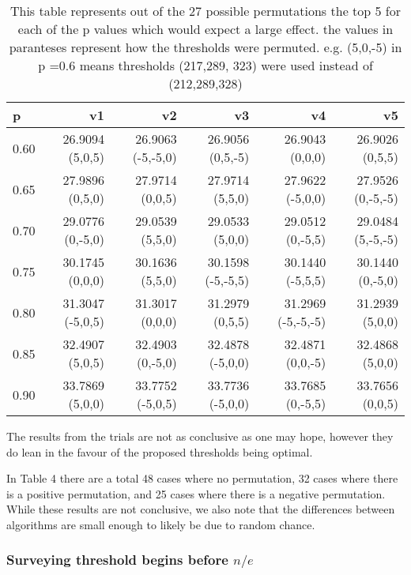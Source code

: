 \documentclass[a4paper,11pt]{article}
\begin{document}
\begin{table}[ht]
\centering
\begin{tabular}{lrrrrr}
\hline
p & v1 & v2 & v3 & v4 & v5 \\
\hline
0.60 & 26.9094 (5,0,5) & 26.9063 (-5,-5,0) & 26.9056 (0,5,-5) & 26.9043 (0,0,0) & 26.9026 (0,5,5) \\
0.65 & 27.9896 (0,5,0) & 27.9714 (0,0,5) & 27.9714 (5,5,0) & 27.9622 (-5,0,0) & 27.9526 (0,-5,-5) \\
0.70 & 29.0776 (0,-5,0) & 29.0539 (5,5,0) & 29.0533 (5,0,0) & 29.0512 (0,-5,5) & 29.0484 (5,-5,-5) \\
0.75 & 30.1745 (0,0,0) & 30.1636 (5,5,0) & 30.1598 (-5,-5,5) & 30.1440 (-5,5,5) & 30.1440 (0,-5,0) \\
0.80 & 31.3047 (-5,0,5) & 31.3017 (0,0,0) & 31.2979 (0,5,5) & 31.2969 (-5,-5,-5) & 31.2939 (5,0,0) \\
0.85 & 32.4907 (5,0,5) & 32.4903 (0,-5,0) & 32.4878 (-5,0,0) & 32.4871 (0,0,-5) & 32.4868 (5,0,0) \\
0.90 & 33.7869 (5,0,0) & 33.7752 (-5,0,5) & 33.7736 (-5,0,0) & 33.7685 (0,-5,5) & 33.7656 (0,0,5) \\
\hline
\end{tabular}
\caption{This table represents out of the 27 possible permutations the top 5 for each of the p values which would expect a large effect. the values in paranteses represent how the thresholds were permuted. e.g. (5,0,-5) in p =0.6 means thresholds (217,289, 323) were used instead of (212,289,328)}
\end{table}

The results from the trials are not as conclusive as one may hope, however they do lean in the favour of the proposed thresholds being optimal. 

In Table 4 there are a total 48 cases where no permutation, 32 cases where there is a positive permutation, and 25 cases where there is a negative permutation. While these results are not conclusive, we also note that the differences between algorithms are small enough to likely be due to random chance. 

\subsubsection{Surveying threshold begins before $n/e$}
\end{document}
